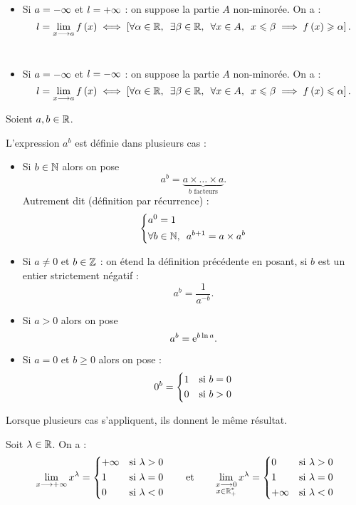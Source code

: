 \begin{prop}
\begin{itemize}
\item Si \(a=-\infty\) et \(l=+\infty\) : on suppose la partie \(A\) non-minorée. On a : \[l=\lim_{x\to a}f\paren{x}\ssi\croch{\quantifs{\forall\alpha\in\R;\exists\beta\in\R;\forall x\in A}x\leq\beta\imp f\paren{x}\geq\alpha}.\] \\

\item Si \(a=-\infty\) et \(l=-\infty\) : on suppose la partie \(A\) non-minorée. On a : \[l=\lim_{x\to a}f\paren{x}\ssi\croch{\quantifs{\forall\alpha\in\R;\exists\beta\in\R;\forall x\in A}x\leq\beta\imp f\paren{x}\leq\alpha}.\]
\end{itemize}
\end{prop}

\begin{rappel}[Définition de \(a^b\)]
Soient \(a,b\in\mathbb{R}\).

L'expression \(a^b\) est définie dans plusieurs cas :

\begin{itemize}
\item Si \(b\in\mathbb{N}\) alors on pose \[a^b=\underbrace{a\times\dots\times a}_{b\text{ facteurs}}.\] Autrement dit (définition par récurrence) : \[\begin{dcases}a^0=1 \\ \quantifs{\forall b\in\N}a^{b+1}=a\times a^b\end{dcases}\]

\item Si \(a\not=0\) et \(b\in\mathbb{Z}\) : on étend la définition précédente en posant, si \(b\) est un entier strictement négatif : \[a^b=\dfrac{1}{a^{-b}}.\]

\item Si \(a>0\) alors on pose \[a^b=\mathrm{e}^{b\ln a}.\]

\item Si \(a=0\) et \(b\geq0\) alors on pose : \[0^b=\begin{dcases}1 &\text{si }b=0 \\ 0 &\text{si }b>0\end{dcases}\]
\end{itemize}

Lorsque plusieurs cas s'appliquent, ils donnent le même résultat.
\end{rappel}

\begin{ex}
Soit \(\lambda\in\mathbb{R}\). On a : \[\lim_{x\longrightarrow+\infty}x^\lambda=\begin{dcases}+\infty &\text{si }\lambda>0 \\ 1 &\text{si }\lambda=0 \\ 0 &\text{si }\lambda<0\end{dcases}\qquad\text{et}\qquad\lim_{\substack{x\longrightarrow0 \\ x\in\mathbb{R}_+^*}}x^\lambda=\begin{dcases}0 &\text{si }\lambda>0 \\ 1 &\text{si }\lambda=0 \\ +\infty &\text{si }\lambda<0\end{dcases}\]
\end{ex}

